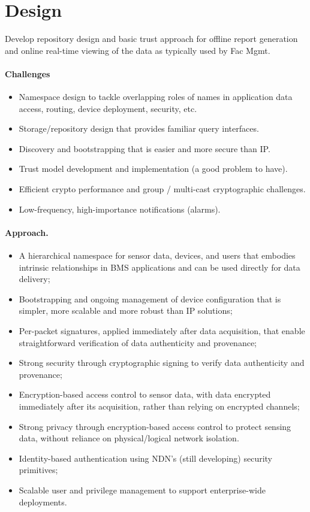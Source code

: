 \section{Design}

Develop repository design and basic trust approach for offline report generation and online real-time viewing of the data as typically used by Fac Mgmt. 

\paragraph{Challenges}
\begin{itemize}
\item Namespace design to tackle overlapping roles of names in application data access, routing, device deployment, security, etc. 
\item Storage/repository design that provides familiar query interfaces.
\item Discovery and bootstrapping that is easier and more secure than IP. 
\item Trust model development and implementation (a good problem to have). 
\item Efficient crypto performance and group / multi-cast cryptographic challenges. 
\item Low-frequency, high-importance notifications (alarms).
\end{itemize}

\paragraph{Approach.}

\begin{itemize}
\item A hierarchical namespace for sensor data, devices, and users that embodies intrinsic relationships in BMS applications and can be used directly for data delivery;
\item Bootstrapping and ongoing management of device configuration that is simpler, more scalable and more robust than IP solutions;
\item Per-packet signatures, applied immediately after data acquisition, that enable  straightforward verification of data authenticity and provenance;
\item Strong security through cryptographic signing to verify data authenticity and provenance;
\item Encryption-based access control to sensor data, with data encrypted immediately after its acquisition, rather than relying on encrypted channels; 
\item Strong privacy through encryption-based access control to protect sensing data, without reliance on physical/logical network isolation.
\item Identity-based authentication using NDN's (still developing) security primitives; 
\item Scalable user and privilege management to support enterprise-wide deployments. 
\end{itemize}


